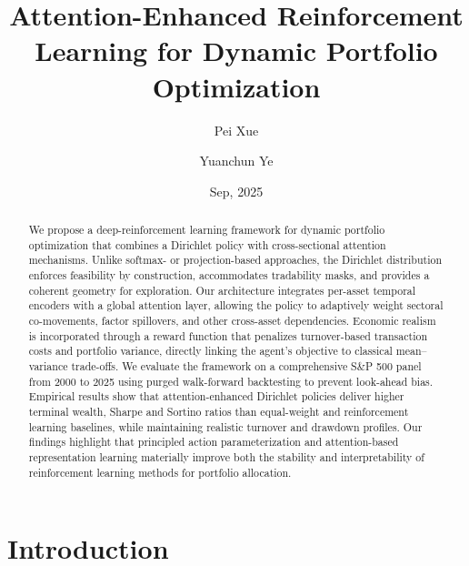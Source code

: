 \documentclass[10pt,leqno]{amsart}
\newcommand{\fnm}[1]{#1}
\begin{document}
\title{Attention-Enhanced Reinforcement Learning for Dynamic Portfolio Optimization} %
\author[1]{\fnm{Pei Xue} }

\author[2]{\fnm{Yuanchun Ye} }



\date{Sep, 2025}
\address{Tepper School of Business, Carnegie Mellon University, Pittsburgh, PA, USA}





\begin{abstract}
We propose a deep-reinforcement learning framework for dynamic portfolio optimization that combines a Dirichlet policy with cross-sectional attention mechanisms. Unlike softmax- or projection-based approaches, the Dirichlet distribution enforces feasibility by construction, accommodates tradability masks, and provides a coherent geometry for exploration. Our architecture integrates per-asset temporal encoders with a global attention layer, allowing the policy to adaptively weight sectoral co-movements, factor spillovers, and other cross-asset dependencies. Economic realism is incorporated through a reward function that penalizes turnover-based transaction costs and portfolio variance, directly linking the agent’s objective to classical mean–variance trade-offs.
We evaluate the framework on a comprehensive S\&P 500 panel from 2000 to 2025 using purged walk-forward backtesting to prevent look-ahead bias. Empirical results show that attention-enhanced Dirichlet policies deliver higher terminal wealth, Sharpe and Sortino ratios than equal-weight and reinforcement learning baselines, while maintaining realistic turnover and drawdown profiles. Our findings highlight that principled action parameterization and attention-based representation learning materially improve both the stability and interpretability of reinforcement learning methods for portfolio allocation.
\end{abstract} %
\maketitle

\bigskip

\section{Introduction}
\end{document}
